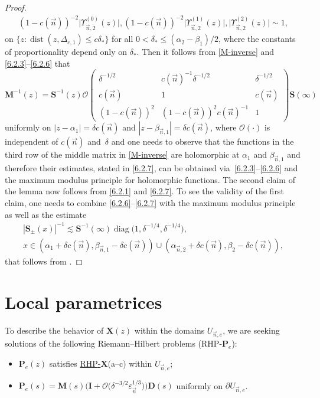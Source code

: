 \documentclass[10pt,a4paper]{amsart}
\numberwithin{equation}{section}
\newcommand{\dist}{\operatorname{dist}}
\newcommand{\diag}{\operatorname{diag}}
\newcommand{\n}{{\vec n}}
\newcommand{\rhx} {\textnormal{RHP}-${\boldsymbol X}$}
\newcommand{\rhp} {\textnormal{RHP}-${\boldsymbol P}$}
\begin{document}
\begin{proof}
\begin{gather}
(1-c(\n))^{-2}\big|\Upsilon_{\n,2}^{(0)}(z)\big|, (1-c(\n))^{-2}\big|\Upsilon_{\n,2}^{(1)}(z)\big|, \big|\Upsilon_{\n,2}^{(2)}(z)\big| \sim 1,\label{6.2.6}
\end{gather}
on $ \{z : \dist(z,\Delta_{c,1})\leq c\delta_*\} $ for all $ 0<\delta_*\leq (\alpha_2-\beta_1)/2 $, where the constants of proportionality depend only on $ \delta_* $. Then it follows from \eqref{M-inverse} and \eqref{6.2.3}--\eqref{6.2.6} that
\begin{equation}
\label{6.2.7}
\boldsymbol M^{-1}(z) = \boldsymbol S^{-1}(z) \boldsymbol{\mathcal O} \begin{pmatrix} \delta^{-1/2} & c(\n)^{-1}\delta^{-1/2} & \delta^{-1/2} \\ c(\n) & 1 & c(\n) \\ (1-c(\n))^2 & (1-c(\n))^2 c(\n)^{-1} & 1 \end{pmatrix} \boldsymbol S(\infty)
\end{equation}
uniformly on $ |z-\alpha_1| = \delta c(\n) $ and $ |z-\beta_{\n,1}| = \delta c(\n) $, where $\boldsymbol{\mathcal O}(\cdot) $ is independent of $ c(\n) $ and~$ \delta $ and one needs to observe that the functions in the third row of the middle matrix in \eqref{M-inverse} are holomorphic at $ \alpha_1 $ and $ \beta_{\n,1} $ and therefore their estimates, stated in \eqref{6.2.7}, can be obtained via~\eqref{6.2.3}--\eqref{6.2.6} and the maximum modulus principle for holomorphic functions. The second claim of the lemma now follows from \eqref{6.2.1} and \eqref{6.2.7}. To see the validity of the first claim, one needs to combine \eqref{6.2.6}--\eqref{6.2.7} with the maximum modulus principle as well as the estimate
\begin{gather*}
|\boldsymbol S_\pm(x)|^{-1} \lesssim \boldsymbol S^{-1}(\infty) \diag\bigl( 1,\delta^{-1/4},\delta^{-1/4} \bigr), \\
 x\in (\alpha_1+\delta c(\n),\beta_{\n,1}-\delta c(\n)) \cup (\alpha_{\n,2}+\delta c(\n),\beta_2-\delta c(\n)),
\end{gather*}
that follows from \cite[Lemma~5.4]{ApDenYa21}.
\end{proof}


\section{Local parametrices}

To describe the behavior of $ \boldsymbol X(z) $ within the domains $ U_{\n,e} $, we are seeking solutions of the following Riemann--Hilbert problems (\rhp$_e$):
\begin{itemize}\itemsep=0pt\setlength{\leftskip}{0.1cm}\label{rhp}
\item[(a--c)] $\boldsymbol P_e(z)$ satisfies \hyperref[rhx]{\rhx}(a--c) within $U_{\n,e}$;
\item[(d)] $\boldsymbol P_e(s)=\boldsymbol M(s)\bigl(\boldsymbol I+\boldsymbol{\mathcal O} \bigl( \delta^{-3/2} \varepsilon_\n^{1/3} \bigr)\bigr)\boldsymbol D(s)$ uniformly on $\partial U_{\n,e} $.
\end{itemize}
\end{document}
